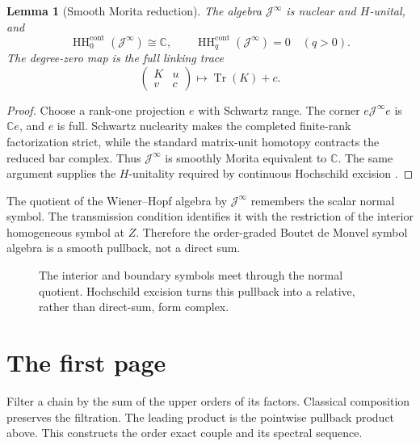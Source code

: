 \documentclass[11pt,oneside,reqno]{article}
\DeclareMathOperator{\HH}{HH}
\DeclareMathOperator{\gr}{gr}
\newcommand{\C}{\mathbb C}
\newcommand{\cJ}{\mathcal J}
\newcommand{\Bcs}{\mathfrak B_{\mathrm{cs}}}
\theoremstyle{plain}
\newtheorem{lemma}[theorem]{Lemma}
\theoremstyle{definition}
\theoremstyle{remark}
\begin{document}
\begin{lemma}[Smooth Morita reduction]\label{lem:morita}
The algebra \(\cJ^\infty\) is nuclear and \(H\)-unital, and
\[
 \HH_0^{\mathrm{cont}}(\cJ^\infty)\cong\C,
 \qquad
 \HH_q^{\mathrm{cont}}(\cJ^\infty)=0\quad(q>0).
\]
The degree-zero map is the full linking trace
\[
 \begin{pmatrix}K&u\\v&c\end{pmatrix}\longmapsto
 \operatorname{Tr}(K)+c.
\]
\end{lemma}

\begin{proof}
Choose a rank-one projection \(e\) with Schwartz range. The corner
\(e\cJ^\infty e\) is \(\C e\), and \(e\) is full. Schwartz nuclearity makes
the completed finite-rank factorization strict, while the standard
matrix-unit homotopy contracts the reduced bar complex. Thus
\(\cJ^\infty\) is smoothly Morita equivalent to \(\C\). The same argument
supplies the \(H\)-unitality required by continuous Hochschild excision
\cite{MeyerExcision}.
\end{proof}

The quotient of the Wiener--Hopf algebra by \(\cJ^\infty\) remembers the
scalar normal symbol. The transmission condition identifies it with the
restriction of the interior homogeneous symbol at \(Z\). Therefore the
order-graded Boutet de Monvel symbol algebra is a smooth pullback, not a
direct sum.

\begin{figure}[htbp]
\centering
{}
\caption[Pullback structure of the graded boundary symbol]{The interior and
boundary symbols meet through the normal quotient. Hochschild excision turns
this pullback into a relative, rather than direct-sum, form complex.}
\end{figure}

\section{The first page}

Filter a chain by the sum of the upper orders of its factors. Classical
composition preserves the filtration. The leading product is the pointwise
pullback product above. This constructs the order exact couple and its
spectral sequence.
\end{document}
